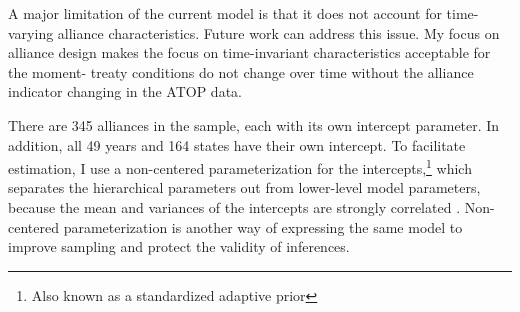 \documentclass[12pt]{article}
\begin{document}
A major limitation of the current model is that it does not account for time-varying alliance characteristics. Future work can address this issue. My focus on alliance design makes the focus on time-invariant characteristics acceptable for the moment- treaty conditions do not change over time without the alliance indicator changing in the ATOP data. 

There are 345 alliances in the sample, each with its own intercept parameter. In addition, all 49 years and 164 states have their own intercept. To facilitate estimation, I use a non-centered parameterization for the intercepts,\footnote{Also known as a standardized adaptive prior} which separates the hierarchical parameters out from lower-level model parameters, because the mean and variances of the intercepts are strongly correlated \citep{BetancourtGirolani2015, McElreath2016}. Non-centered parameterization is another way of expressing the same model to improve sampling and protect the validity of inferences. 







  
% 
\end{document}
